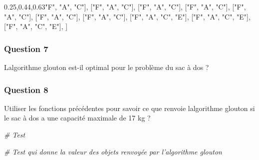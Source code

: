 \documentclass[
  paper=a4,
  ,captions=tableheading
]{scrartcl}
\newenvironment{Shaded}{}{}
\newcommand{\CommentTok}[1]{\textcolor[rgb]{0.38,0.63,0.69}{\textit{#1}}}
\newcommand{\NormalTok}[1]{#1}
\newcommand{\StringTok}[1]{\textcolor[rgb]{0.25,0.44,0.63}{#1}}
\begin{document}
\begin{Shaded}
\begin{Highlighting}[]
\NormalTok{    [}\StringTok{"F"}\NormalTok{, }\StringTok{"A"}\NormalTok{, }\StringTok{"C"}\NormalTok{],}
\NormalTok{    [}\StringTok{"F"}\NormalTok{, }\StringTok{"A"}\NormalTok{, }\StringTok{"C"}\NormalTok{],}
\NormalTok{    [}\StringTok{"F"}\NormalTok{, }\StringTok{"A"}\NormalTok{, }\StringTok{"C"}\NormalTok{],}
\NormalTok{    [}\StringTok{"F"}\NormalTok{, }\StringTok{"A"}\NormalTok{, }\StringTok{"C"}\NormalTok{],}
\NormalTok{    [}\StringTok{"F"}\NormalTok{, }\StringTok{"A"}\NormalTok{, }\StringTok{"C"}\NormalTok{],}
\NormalTok{    [}\StringTok{"F"}\NormalTok{, }\StringTok{"A"}\NormalTok{, }\StringTok{"C"}\NormalTok{],}
\NormalTok{    [}\StringTok{"F"}\NormalTok{, }\StringTok{"A"}\NormalTok{, }\StringTok{"C"}\NormalTok{],}
\NormalTok{    [}\StringTok{"F"}\NormalTok{, }\StringTok{"A"}\NormalTok{, }\StringTok{"C"}\NormalTok{, }\StringTok{"E"}\NormalTok{],}
\NormalTok{    [}\StringTok{"F"}\NormalTok{, }\StringTok{"A"}\NormalTok{, }\StringTok{"C"}\NormalTok{, }\StringTok{"E"}\NormalTok{],}
\NormalTok{    [}\StringTok{"F"}\NormalTok{, }\StringTok{"A"}\NormalTok{, }\StringTok{"C"}\NormalTok{, }\StringTok{"E"}\NormalTok{],}
\NormalTok{]}
\end{Highlighting}
\end{Shaded}

\hypertarget{question-7}{%
\subsubsection{Question 7}\label{question-7}}

L\textquotesingle algorithme glouton est-il optimal pour le problème du
sac à dos ?

\hypertarget{question-8}{%
\subsubsection{Question 8}\label{question-8}}

Utiliser les fonctions précédentes pour savoir ce que renvoie
l\textquotesingle algorithme glouton si le sac à dos a une capacité
maximale de 17 kg ?

\begin{Shaded}
\begin{Highlighting}[]
\CommentTok{\# Test}
\end{Highlighting}
\end{Shaded}

\begin{Shaded}
\begin{Highlighting}[]
\CommentTok{\# Test qui donne la valeur des objets renvoyée par l’algorithme glouton}
\end{Highlighting}
\end{Shaded}
\end{document}
